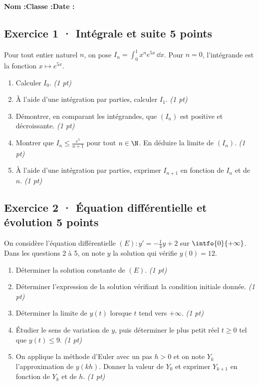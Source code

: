 \smallskip\textbf{Nom :}\enspace\dotfill\quad\textbf{Classe :}\enspace\dotfill\quad\textbf{Date :}\enspace\dotfill

\subsection*{Exercice 1 · Intégrale et suite \hfill 5 points}Pour tout entier naturel $n$, on pose $I_n=\displaystyle\int_0^1x^ne^{5x}\,\dd x$. Pour $n=0$, l'intégrande est la fonction $x\mapsto e^{5x}$.

\begin{enumerate}

\item Calculer $I_0$. \hfill\textit{(1 pt)}

\item À l'aide d'une intégration par parties, calculer $I_1$. \hfill\textit{(1 pt)}

\item Démontrer, en comparant les intégrandes, que $(I_n)$ est positive et décroissante. \hfill\textit{(1 pt)}

\item Montrer que $I_n\le\frac{e^{5}}{n+1}$ pour tout $n\in\N$. En déduire la limite de $(I_n)$. \hfill\textit{(1 pt)}

\item À l'aide d'une intégration par parties, exprimer $I_{n+1}$ en fonction de $I_n$ et de $n$. \hfill\textit{(1 pt)}

\end{enumerate}

\subsection*{Exercice 2 · Équation différentielle et évolution \hfill 5 points}On considère l'équation différentielle $(E):y'=-\frac1{4}y+2$ sur $\intfo{0}{+\infty}$. Dans les questions 2 à 5, on note $y$ la solution qui vérifie $y(0)=12$.

\begin{enumerate}

\item Déterminer la solution constante de $(E)$. \hfill\textit{(1 pt)}

\item Déterminer l'expression de la solution vérifiant la condition initiale donnée. \hfill\textit{(1 pt)}

\item Déterminer la limite de $y(t)$ lorsque $t$ tend vers $+\infty$. \hfill\textit{(1 pt)}

\item Étudier le sens de variation de $y$, puis déterminer le plus petit réel $t\ge0$ tel que $y(t)\le9$. \hfill\textit{(1 pt)}

\item On applique la méthode d'Euler avec un pas $h>0$ et on note $Y_k$ l'approximation de $y(kh)$. Donner la valeur de $Y_0$ et exprimer $Y_{k+1}$ en fonction de $Y_k$ et de $h$. \hfill\textit{(1 pt)}

\end{enumerate}

